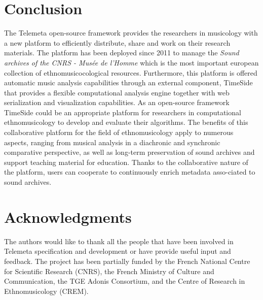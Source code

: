 \documentclass{sig-alternate}
\begin{document}
\section{Conclusion}
The Telemeta open-source framework provides the researchers in musicology with a new platform to efficiently distribute, share and work on their research materials.
The platform has been deployed since 2011 to manage the \emph{Sound archives of the CNRS - Musée de l'Homme} which is the most important european collection of ethnomusicocological resources.
Furthermore, this platform is offered automatic music analysis capabilities through an external component, TimeSide that provides a flexible computational analysis engine together with web serialization and visualization capabilities. As an open-source framework TimeSide could be an appropriate platform for researchers in computational ethnomusicology to develop and evaluate their algorithms.
The benefits of this collaborative platform for the field of ethnomusicology apply to numerous aspects, ranging from musical analysis in a diachronic and synchronic comparative perspective, as well as long-term preservation of sound archives and support teaching material for education. Thanks to the collaborative nature of the platform, users can cooperate to continuously enrich metadata asso-ciated to sound archives.

\section{Acknowledgments}
The authors would like to thank all the people that have been involved in Telemeta specification and development or have provide useful input and feedback. 
The project has been partially funded by the French National Centre for Scientific Research (CNRS), the French Ministry of Culture and Communication, the TGE Adonis Consortium, and the Centre of Research in Ethnomusicology (CREM).





\end{document}
